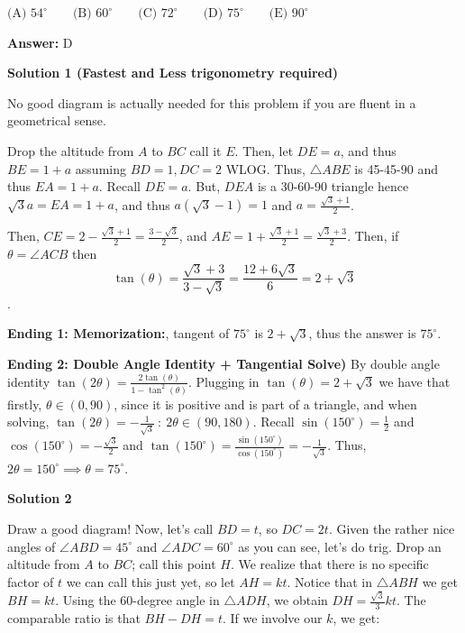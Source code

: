 \begin{enumerate}
 $\text{(A) }54^\circ \qquad \text{(B) }60^\circ \qquad \text{(C) }72^\circ \qquad \text{(D) }75^\circ \qquad \text{(E) }90^\circ$

 \textbf{Answer: }D



\textbf{Solution 1 (Fastest and Less trigonometry required)}

No good diagram is actually needed for this problem if you are fluent in a geometrical sense.

 Drop the altitude from $A$ to $BC$ call it $E$. Then, let $DE = a$, and thus $BE = 1+a$ assuming $BD = 1, DC = 2$ WLOG. Thus, $\triangle ABE$ is 45-45-90 and thus $EA = 1+a$. Recall $DE = a$. But, $DEA$ is a 30-60-90 triangle hence $\sqrt{3} a = EA = 1+a$, and thus $a(\sqrt{3}-1) = 1$ and $a = \frac{\sqrt{3}+1}{2}$. 

 Then, $CE = 2 - \frac{\sqrt{3}+1}{2} = \frac{3-\sqrt{3}}{2}$, and $AE = 1+\frac{\sqrt{3}+1}{2} = \frac{\sqrt{3}+3}{2}$. Then, if $\theta = \angle ACB$ then 
 \[\tan(\theta) = \frac{\sqrt{3}+3}{3-\sqrt{3}} = \frac{12+6\sqrt{3}}{6} = 2 + \sqrt{3}\].

 \textbf{Ending 1: Memorization:}, tangent of $75^\circ$ is $2+\sqrt{3}$, thus the answer is $\boxed{75^\circ}$.

 \textbf{Ending 2: Double Angle Identity + Tangential Solve)} By double angle identity $\tan(2\theta) = \frac{2\tan(\theta)}{1-\tan^2(\theta)}$. Plugging in $\tan(\theta) = 2+\sqrt{3}$ we have that firstly, $\theta \in (0,90)$, since it is positive and is part of a triangle, and when solving, $\tan(2\theta) = -\frac{1}{\sqrt{3}} \ : \ 2\theta \in (90,180)$. Recall $\sin(150^\circ) = \frac{1}{2}$ and $\cos(150^\circ) = -\frac{\sqrt{3}}{2}$ and $\tan(150^\circ) = \frac{\sin(150^\circ)}{\cos(150^\circ)} = -\frac{1}{\sqrt{3}}$. Thus, $2\theta = 150^\circ \implies \theta = \boxed{75^\circ}$.

 



\textbf{Solution 2}

Draw a good diagram! Now, let's call $BD=t$, so $DC=2t$. Given the rather nice angles of $\angle ABD = 45^\circ$ and $\angle ADC = 60^\circ$ as you can see, let's do trig. Drop an altitude from $A$ to $BC$; call this point $H$. We realize that there is no specific factor of $t$ we can call this just yet, so let $AH=kt$. Notice that in $\triangle{ABH}$ we get $BH=kt$. Using the 60-degree angle in $\triangle{ADH}$, we obtain $DH=\frac{\sqrt{3}}{3}kt$. The comparable ratio is that $BH-DH=t$. If we involve our $k$, we get:


\end{enumerate}
